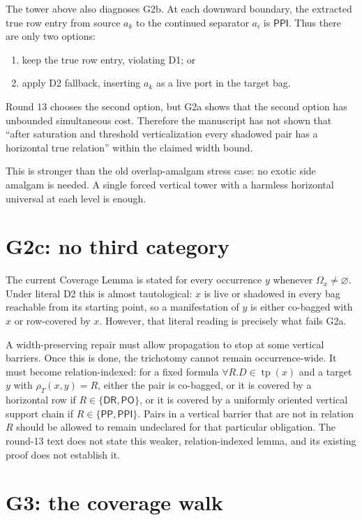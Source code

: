 \documentclass[11pt]{article}
\newcommand{\PP}{\mathsf{PP}}
\newcommand{\PPI}{\mathsf{PPI}}
\newcommand{\PO}{\mathsf{PO}}
\newcommand{\DR}{\mathsf{DR}}
\newcommand{\tp}{\operatorname{tp}}
\begin{document}
The tower above also diagnoses G2b.  At each downward boundary, the extracted
true row entry from source $a_k$ to the continued separator $a_i$ is $\PPI$.
Thus there are only two options:
\begin{enumerate}[leftmargin=2em]
\item keep the true row entry, violating D1; or
\item apply D2 fallback, inserting $a_k$ as a live port in the target bag.
\end{enumerate}
Round 13 chooses the second option, but G2a shows that the second option has
unbounded simultaneous cost.  Therefore the manuscript has not shown that
``after saturation and threshold verticalization every shadowed pair has a
horizontal true relation'' within the claimed width bound.

This is stronger than the old overlap-amalgam stress case: no exotic side
amalgam is needed.  A single forced vertical tower with a harmless horizontal
universal at each level is enough.

\section{G2c: no third category}

The current Coverage Lemma is stated for every occurrence $y$ whenever
$\Omega_x\ne\varnothing$.  Under literal D2 this is almost tautological:
$x$ is live or shadowed in every bag reachable from its starting point, so a
manifestation of $y$ is either co-bagged with $x$ or row-covered by $x$.
However, that literal reading is precisely what fails G2a.

A width-preserving repair must allow propagation to stop at some vertical
barriers.  Once this is done, the trichotomy cannot remain occurrence-wide.  It
must become relation-indexed: for a fixed formula $\forall R.D\in\tp(x)$ and a
target $y$ with $\rho_T(x,y)=R$, either the pair is co-bagged, or it is covered
by a horizontal row if $R\in\{\DR,\PO\}$, or it is covered by a uniformly
oriented vertical support chain if $R\in\{\PP,\PPI\}$.  Pairs in a vertical
barrier that are not in relation $R$ should be allowed to remain undeclared for
that particular obligation.  The round-13 text does not state this weaker,
relation-indexed lemma, and its existing proof does not establish it.

\section{G3: the coverage walk}
\end{document}
